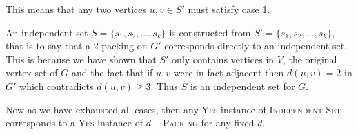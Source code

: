 \documentclass[10pt, a4paper]{article}
\theoremstyle{definition}
\begin{document}
This means that any two vertices $u,v \in S'$ must satisfy case 1.

An independent set $S = \{s_1,s_2,...,s_k\}$ is constructed from $S' = \{s_1,s_2,...,s_k\}$, that is to say that a 2-packing on $G'$ corresponds directly to an independent set. This is because we have shown that $S'$ only contains vertices in $V$, the original vertex set of $G$ and the fact that if $u,v$ were in fact adjacent then $d(u,v) = 2$ in $G'$ which contradicts $d(u,v) \geq 3$. Thus $S$ is an independent set for $G$.

Now as we have exhausted all cases, then any \textsc{Yes} instance of \textsc{Independent Set} corresponds to a \textsc{Yes} instance of $d-$\textsc{Packing} for any fixed $d$.






\end{document}
